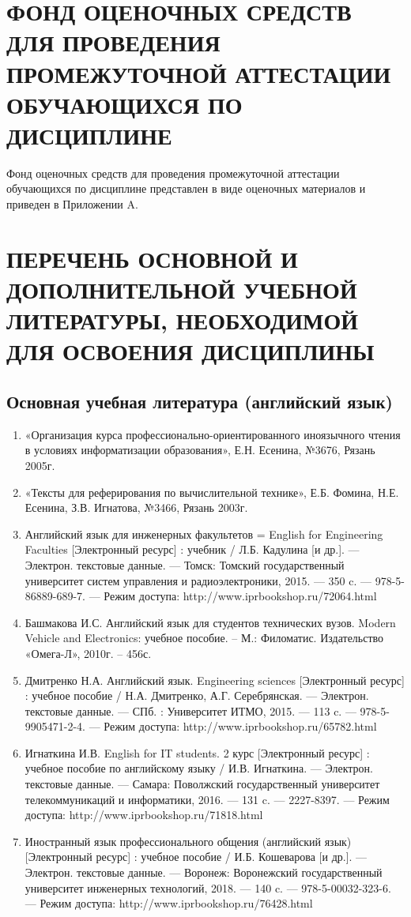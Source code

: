 \chapter{ФОНД ОЦЕНОЧНЫХ СРЕДСТВ ДЛЯ ПРОВЕДЕНИЯ ПРОМЕЖУТОЧНОЙ АТТЕСТАЦИИ ОБУЧАЮЩИХСЯ ПО ДИСЦИПЛИНЕ}
\label{chapt6}
Фонд оценочных средств для проведения промежуточной аттестации обучающихся по дисциплине представлен в виде оценочных материалов и приведен в Приложении A.

\chapter{ПЕРЕЧЕНЬ ОСНОВНОЙ И ДОПОЛНИТЕЛЬНОЙ УЧЕБНОЙ ЛИТЕРАТУРЫ, НЕОБХОДИМОЙ ДЛЯ ОСВОЕНИЯ ДИСЦИПЛИНЫ}
\label{chapt7}
\section{Основная учебная литература (английский язык)}
\begin{enumerate}
\item «Организация курса профессионально-ориентированного иноязычного чтения в условиях информатизации образования», Е.Н. Есенина, №3676, Рязань 2005г. 
\item «Тексты для реферирования по вычислительной технике», Е.Б. Фомина, Н.Е. Есенина, З.В. Игнатова, №3466, Рязань 2003г.
\item Английский язык для инженерных факультетов = English for Engineering Faculties [Электронный ресурс] : учебник / Л.Б. Кадулина [и др.]. — Электрон. текстовые данные. — Томск: Томский государственный университет систем управления и радиоэлектроники, 2015. — 350 c. — 978-5-86889-689-7. — Режим доступа: http://www.iprbookshop.ru/72064.html
\item Башмакова И.С. Английский язык для студентов технических вузов. Modern Vehicle and Electronics: учебное пособие. – М.: Филоматис. Издательство «Омега-Л», 2010г. – 456с.
\item Дмитренко Н.А. Английский язык. Engineering sciences [Электронный ресурс] : учебное пособие / Н.А. Дмитренко, А.Г. Серебрянская. — Электрон. текстовые данные. — СПб. : Университет ИТМО, 2015. — 113 c. — 978-5-9905471-2-4. — Режим доступа: http://www.iprbookshop.ru/65782.html
\item Игнаткина И.В. English for IT students. 2 курс [Электронный ресурс] : учебное пособие по английскому языку / И.В. Игнаткина. — Электрон. текстовые данные. — Самара: Поволжский государственный университет телекоммуникаций и информатики, 2016. — 131 c. — 2227-8397. — Режим доступа: http://www.iprbookshop.ru/71818.html
\item Иностранный язык профессионального общения (английский язык) [Электронный ресурс] : учебное пособие / И.Б. Кошеварова [и др.]. — Электрон. текстовые данные. — Воронеж: Воронежский государственный университет инженерных технологий, 2018. — 140 c. — 978-5-00032-323-6. — Режим доступа: http://www.iprbookshop.ru/76428.html
\end{enumerate}
